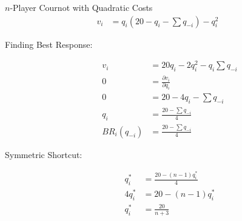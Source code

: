 \documentclass[8pt]{extarticle}
\begin{document}
  \begin{problem}{$n$-Player Cournot with Quadratic Costs}
    \begin{align*}
      v_i &= q_i\left(20-q_i-\sum q_{-i}\right) - q_i^2
    \end{align*}
    \begin{description}
      \item[Finding Best Response:]\hfill
        \begin{align*}
          v_i &= 20q_i - 2q_i^2 - q_i\sum q_{-i}\\
          0 &= \frac{\partial v_i}{\partial q_i}\\
          0 &= 20 - 4q_i - \sum q_{-i}\\
          q_i &= \frac{20-\sum q_{-i}}{4}\\
          BR_i(q_{-i}) &= \frac{20-\sum q_{-i}}{4}
        \end{align*}
      \item[Symmetric Shortcut:]\hfill
        \begin{align*}
          q_i^* &= \frac{20-(n-1)q_{i}^*}{4}\\
          4q_i^* &= 20-(n-1)q_i^*\\
          q_i^* &= \frac{20}{n+3}
        \end{align*}
    \end{description}
  \end{problem}
\end{document}
